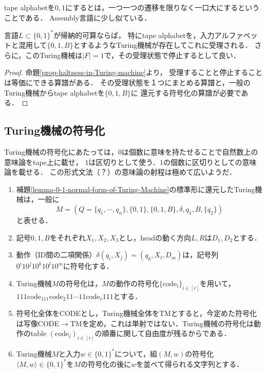 \begin{tcolorbox}[colframe=ForestGreen, colback=ForestGreen!10!white, breakable]
    tape alphabetを$0,1$にするとは，一つ一つの遷移を限りなく一口大にするということである．
    Assembly言語に少し似ている．
\end{tcolorbox}

\begin{lemma}\label{lemma-0-1-normal-form-of-Turing-Machine}
    言語$L\subset\{0,1\}^*$が帰納的可算ならば，
    特にtape alphabetを，入力アルファベットと混用して$\{0,1,B\}$とするようなTuring機械が存在してこれに受理される．
    さらに，このTuring機械は$|F|=1$で，その受理状態で停止するとして良い．
\end{lemma}
\begin{proof}
    命題\ref{prop-haltness-in-Turing-machine}より，
    受理することと停止することは等価にできる算譜がある．
    その受理状態を１つにまとめる算譜と，一般のTuring機械からtape alphabetを$\{0,1,B\}$に
    還元する符号化の算譜が必要である．
\end{proof}

\subsection{Turing機械の符号化}

\begin{tcolorbox}[colframe=ForestGreen, colback=ForestGreen!10!white, breakable]
    Turing機械の符号化にあたっては，$0$は個数に意味を持たせることで自然数上の意味論をtape上に載せ，
    $1$は区切りとして使う．$1$の個数に区切りとしての意味論を載せる．
    この形式文法（？）の意味論の射程は極めて広いようだ．
\end{tcolorbox}

\begin{definition}\mbox{}\label{def-encoding-of-Turing-machine}
    \begin{enumerate}
        \item 補題\ref{lemma-0-1-normal-form-of-Turing-Machine}の標準形に還元したTuring機械は，一般に
        \[M=(Q=\{q_1,\cdots,q_n\},\{0,1\},\{0,1,B\},\delta,q_1,B,\{q_2\})\]
        と表せる．
        \item 記号$0,1,B$をそれぞれ$X_1,X_2,X_3$とし，headの動く方向$L,R$は$D_1,D_2$とする．
        \item 動作（ID間の二項関係）$\delta(q_i,X_j)=(q_k,X_l,D_m)$は，記号列$0^i10^j10^k10^l10^m$に符号化する．
        \item Turing機械$M$の符号化は，$M$の動作の符号化$\{\mathrm{code}_i\}_{i\in[r]}$を用いて，$111\mathrm{code}_111\mathrm{code_2}11\cdots 11\mathrm{code}_r111$とする．
        \item 符号化全体をCODEとし，Turing機械全体をTMとすると，今定めた符号化は写像CODE$\to$TMを定め，これは単射ではない．Turing機械の符号化は動作のtable $(\mathrm{code}_i)_{i\in[r]}$の順番に関して自由度が残るからである．
        \item Turing機械$M$と入力$w\in\{0,1\}^*$について，組$(M,w)$の符号化$\langle M,w\rangle\in\{0,1\}^*$を$M$の符号化の後に$w$を並べて得られる文字列とする．
    \end{enumerate}
\end{definition}

